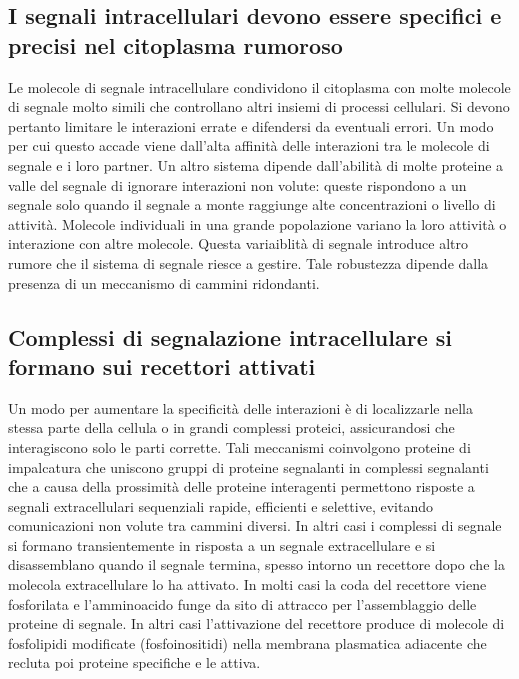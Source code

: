 \subsection{I segnali intracellulari devono essere specifici e precisi nel citoplasma rumoroso}
Le molecole di segnale intracellulare condividono il citoplasma con molte molecole di segnale molto simili che controllano altri insiemi di processi cellulari. Si devono pertanto 
limitare le interazioni errate e difendersi da eventuali errori. Un modo per cui questo accade viene dall'alta affinit\`a delle interazioni tra le molecole di segnale e i loro partner.
Un altro sistema dipende dall'abilit\`a di molte proteine a valle del segnale di ignorare interazioni non volute: queste rispondono a un segnale solo quando il segnale a monte raggiunge
alte concentrazioni o livello di attivit\`a. Molecole individuali in una grande popolazione variano la loro attivit\`a o interazione con altre molecole. Questa variaiblit\`a di segnale
introduce altro rumore che il sistema di segnale riesce a gestire. Tale robustezza dipende dalla presenza di un meccanismo di cammini ridondanti.
\subsection{Complessi di segnalazione intracellulare si formano sui recettori attivati}
Un modo per aumentare la specificit\`a delle interazioni \`e di localizzarle nella stessa parte della cellula o in grandi complessi proteici, assicurandosi che interagiscono solo le
parti corrette. Tali meccanismi coinvolgono proteine di impalcatura che uniscono gruppi di proteine segnalanti in complessi segnalanti che a causa della prossimit\`a delle proteine
interagenti permettono risposte a segnali extracellulari sequenziali rapide, efficienti e selettive, evitando comunicazioni non volute tra cammini diversi. In altri casi i complessi di 
segnale si formano transientemente in risposta a un segnale extracellulare e si disassemblano quando il segnale termina, spesso intorno un recettore dopo che la molecola extracellulare
lo ha attivato. In molti casi la coda del recettore viene fosforilata e l'amminoacido funge da sito di attracco per l'assemblaggio delle proteine di segnale. In altri casi l'attivazione
del recettore produce di molecole di fosfolipidi modificate (fosfoinositidi) nella membrana plasmatica adiacente che recluta poi proteine specifiche e le attiva.
